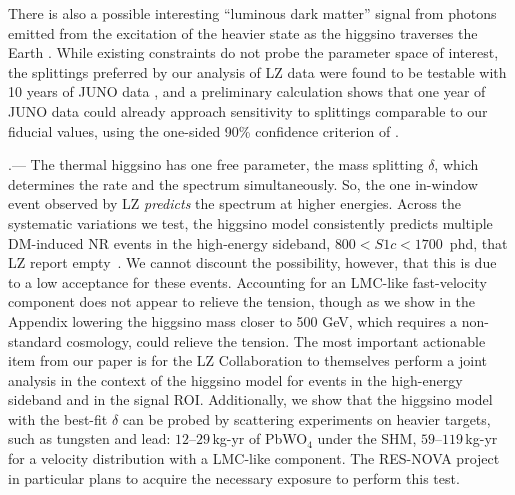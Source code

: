 \documentclass[reprint,superscriptaddress,preprintnumbers,amsmath,amssymb,aps,prd,tightenlines,longbibliography,nofootinbib]{revtex4-2}
\makeatletter
\def\section{\@ifstar\rs@star\rs@nostar}
\def\rs@nostar#1{\par\addvspace{5pt plus 2pt}\noindent{\itshape #1}.---\nobreak\ignorespaces}
\def\rs@star#1{\par\addvspace{5pt plus 2pt}\noindent{\itshape #1}.---\nobreak\ignorespaces}
\makeatother
\begin{document}
There is also a possible interesting ``luminous dark matter'' signal from photons emitted from the excitation of the heavier state as the higgsino traverses the Earth \cite{Graham:2024hah}. While existing constraints do not probe the parameter space of interest, the splittings preferred by our analysis of LZ data were found to be testable with 10 years of JUNO data \cite{Graham:2024hah}, and a preliminary calculation shows that one year of JUNO data could already approach sensitivity to  splittings comparable to our fiducial values, using the one-sided 90\% confidence criterion of \cite{Graham:2024hah}.

\section{Discussion}
%
The thermal higgsino has one free parameter, the mass splitting $\delta$, which determines the rate and the spectrum simultaneously.
So, the one in-window event observed by LZ {\it predicts} the spectrum at higher energies. Across the systematic variations we test, the higgsino model consistently predicts multiple DM-induced NR events in the high-energy sideband, $800<S1c<1700$~phd, that LZ report
empty~\cite{LZ:2026axp}. We cannot discount the possibility, however, that this is due to a low acceptance for these events.  Accounting for an LMC-like fast-velocity component does not appear to relieve the tension, though as we show in the Appendix lowering the higgsino mass closer to 500 GeV, which requires a non-standard cosmology, could relieve the tension. The most important actionable item from our paper is for the LZ Collaboration to themselves perform a joint analysis in the context of the higgsino model for events in the high-energy sideband and in the signal ROI. 
Additionally, we show that the higgsino model with the best-fit $\delta$ can be probed by scattering experiments on heavier targets, such as tungsten and lead: $12$--$29$\,kg-yr of
PbWO$_4$ under the SHM, $59$--$119$\,kg-yr for a velocity distribution with a LMC-like component.  The RES-NOVA project~\cite{RES-NOVA:2026} in particular plans to acquire the necessary exposure to perform this test. 
\end{document}
